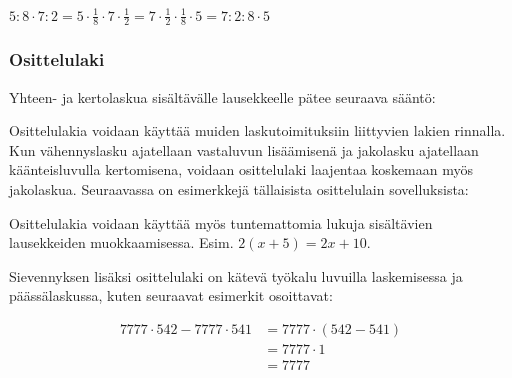 \begin{esimerkki}
$5:8\cdot 7:2=5\cdot\frac18\cdot 7\cdot\frac12=7\cdot \frac12\cdot\frac18\cdot 5=7:2:8\cdot 5$
\end{esimerkki}

\subsubsection*{Osittelulaki}

Yhteen- ja kertolaskua sisältävälle lausekkeelle pätee seuraava sääntö:


Osittelulakia voidaan käyttää muiden laskutoimituksiin liittyvien lakien rinnalla. Kun vähennyslasku ajatellaan vastaluvun lisäämisenä ja jakolasku ajatellaan käänteisluvulla kertomisena, voidaan osittelulaki laajentaa koskemaan myös jakolaskua. Seuraavassa on esimerkkejä tällaisista osittelulain sovelluksista:


Osittelulakia voidaan käyttää myös tuntemattomia lukuja sisältävien lausekkeiden muokkaamisessa. Esim. $2(x+5)=2x+10$.

Sievennyksen lisäksi osittelulaki on kätevä työkalu luvuilla laskemisessa ja päässälaskussa, kuten seuraavat esimerkit osoittavat:

\begin{esimerkki}
     \begin{align*}
7777\cdot 542-7777\cdot 541 &= 7777\cdot (542-541) \\ &= 7777\cdot 1 \\ &= 7777
     \end{align*}
\end{esimerkki}

